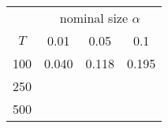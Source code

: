% 
\begin{tabular}{cccc}
  \hline
  & \multicolumn{3}{c}{nominal size $\alpha$} \\
 $T$ & 0.01 & 0.05 & 0.1 \\
 \hline
100 & 0.040 & 0.118 & 0.195 \\ 
  250 &  &  &  \\ 
  500 &  &  &  \\ 
   \hline
\end{tabular}
